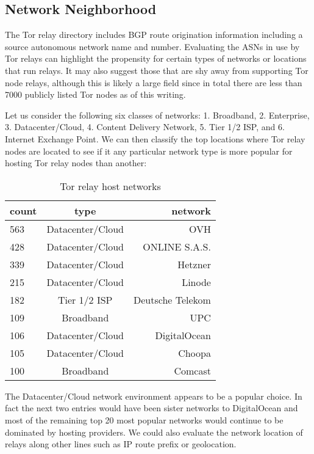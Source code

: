 \documentclass[sigconf]{acmart}
\begin{document}
\subsection{Network Neighborhood}

The Tor relay directory includes BGP route origination information
including a source autonomous network name and number.  Evaluating the
ASNs in use by Tor relays can highlight the propensity for certain types
of networks or locations that run relays.  It may also suggest those
that are shy away from supporting Tor node relays, although this is
likely a large field since in total there are less than 7000 publicly
listed Tor nodes as of this writing.

Let us consider the following six classes of networks: 1. Broadband, 2.
Enterprise, 3. Datacenter/Cloud, 4. Content Delivery Network, 5. Tier 1/2 ISP,
and 6. Internet Exchange Point.  We can then classify the top locations where Tor relay
nodes are located to see if it any particular network type is more
popular for hosting Tor relay nodes than another:

\begin{center}
  \begin{table}[h]
  \begin{tabular} { l | c | r }
  \hline
  count & type & network \\ \hline
  563 & Datacenter/Cloud & OVH \\ \hline
  428 & Datacenter/Cloud & ONLINE S.A.S.  \\ \hline
  339 & Datacenter/Cloud & Hetzner \\ \hline
  215 & Datacenter/Cloud & Linode \\ \hline
  182 & Tier 1/2 ISP & Deutsche Telekom \\ \hline
  109 & Broadband & UPC \\ \hline
  106 & Datacenter/Cloud & DigitalOcean \\ \hline
  105 & Datacenter/Cloud & Choopa \\ \hline
  100 & Broadband & Comcast \\ \hline
  \hline
  \end{tabular}
  \caption{Tor relay host networks}
  \end{table}
\end{center}

The Datacenter/Cloud network environment appears to be a popular choice.
In fact the next two entries would have been sister networks to
DigitalOcean and most of the remaining top 20 most popular networks
would continue to be dominated by hosting providers.  We could also
evaluate the network location of relays along other lines such as IP
route prefix or geolocation.
\end{document}
